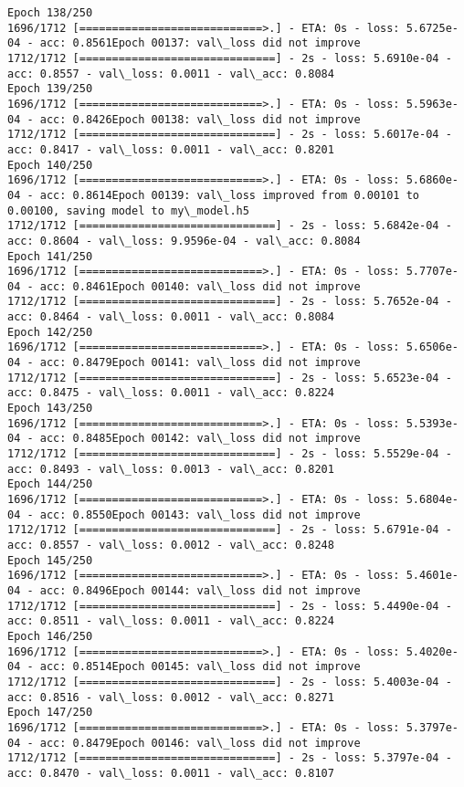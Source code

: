 \documentclass[11pt]{article}
\begin{document}
\begin{Verbatim}[commandchars=\\\{\}]
Epoch 138/250
1696/1712 [============================>.] - ETA: 0s - loss: 5.6725e-04 - acc: 0.8561Epoch 00137: val\_loss did not improve
1712/1712 [==============================] - 2s - loss: 5.6910e-04 - acc: 0.8557 - val\_loss: 0.0011 - val\_acc: 0.8084
Epoch 139/250
1696/1712 [============================>.] - ETA: 0s - loss: 5.5963e-04 - acc: 0.8426Epoch 00138: val\_loss did not improve
1712/1712 [==============================] - 2s - loss: 5.6017e-04 - acc: 0.8417 - val\_loss: 0.0011 - val\_acc: 0.8201
Epoch 140/250
1696/1712 [============================>.] - ETA: 0s - loss: 5.6860e-04 - acc: 0.8614Epoch 00139: val\_loss improved from 0.00101 to 0.00100, saving model to my\_model.h5
1712/1712 [==============================] - 2s - loss: 5.6842e-04 - acc: 0.8604 - val\_loss: 9.9596e-04 - val\_acc: 0.8084
Epoch 141/250
1696/1712 [============================>.] - ETA: 0s - loss: 5.7707e-04 - acc: 0.8461Epoch 00140: val\_loss did not improve
1712/1712 [==============================] - 2s - loss: 5.7652e-04 - acc: 0.8464 - val\_loss: 0.0011 - val\_acc: 0.8084
Epoch 142/250
1696/1712 [============================>.] - ETA: 0s - loss: 5.6506e-04 - acc: 0.8479Epoch 00141: val\_loss did not improve
1712/1712 [==============================] - 2s - loss: 5.6523e-04 - acc: 0.8475 - val\_loss: 0.0011 - val\_acc: 0.8224
Epoch 143/250
1696/1712 [============================>.] - ETA: 0s - loss: 5.5393e-04 - acc: 0.8485Epoch 00142: val\_loss did not improve
1712/1712 [==============================] - 2s - loss: 5.5529e-04 - acc: 0.8493 - val\_loss: 0.0013 - val\_acc: 0.8201
Epoch 144/250
1696/1712 [============================>.] - ETA: 0s - loss: 5.6804e-04 - acc: 0.8550Epoch 00143: val\_loss did not improve
1712/1712 [==============================] - 2s - loss: 5.6791e-04 - acc: 0.8557 - val\_loss: 0.0012 - val\_acc: 0.8248
Epoch 145/250
1696/1712 [============================>.] - ETA: 0s - loss: 5.4601e-04 - acc: 0.8496Epoch 00144: val\_loss did not improve
1712/1712 [==============================] - 2s - loss: 5.4490e-04 - acc: 0.8511 - val\_loss: 0.0011 - val\_acc: 0.8224
Epoch 146/250
1696/1712 [============================>.] - ETA: 0s - loss: 5.4020e-04 - acc: 0.8514Epoch 00145: val\_loss did not improve
1712/1712 [==============================] - 2s - loss: 5.4003e-04 - acc: 0.8516 - val\_loss: 0.0012 - val\_acc: 0.8271
Epoch 147/250
1696/1712 [============================>.] - ETA: 0s - loss: 5.3797e-04 - acc: 0.8479Epoch 00146: val\_loss did not improve
1712/1712 [==============================] - 2s - loss: 5.3797e-04 - acc: 0.8470 - val\_loss: 0.0011 - val\_acc: 0.8107

\end{Verbatim}
\end{document}
